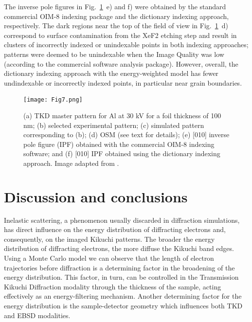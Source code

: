 The \hkl[010] inverse pole figures in Fig.~\ref{fig:TKDindex}~e) and f) were obtained by the standard commercial OIM-8 indexing package and the dictionary indexing approach, respectively. The dark regions near the top of the field of view in Fig.~\ref{fig:TKDindex}~d) correspond to surface contamination from the XeF2 etching step and result in clusters of incorrectly indexed or unindexable points in both indexing approaches; patterns were deemed to be unindexable when the Image Quality was low (according to the commercial software analysis package). However, overall, the dictionary indexing approach with the energy-weighted model has fewer undindexable or incorrectly indexed points, in particular near grain boundaries.

\begin{figure}[t]
\centering
\texttt{[image: Fig7.png]}
\caption[Dictionary indexing TKD pattern]{ (a) TKD master pattern for Al at 30 kV for a foil thickness of 100 nm; (b) selected experimental pattern; (c) simulated pattern corresponding to (b); (d) OSM (see text for details); (e) [010] inverse pole figure (IPF) obtained with the commercial OIM-8 indexing software; and (f) [010] IPF obtained using the dictionary indexing approach. Image adapted from \cite{PascalTKD}. }
\label{fig:TKDindex}
\end{figure}


%
\section{Discussion and conclusions \label{sec:discussion}}

Inelastic scattering, a phenomenon usually discarded in diffraction simulations, has direct influence on the energy distribution of diffracting electrons and, consequently, on the imaged Kikuchi patterns. The broader the energy distribution of diffracting electrons, the more diffuse the Kikuchi band edges. Using a Monte Carlo model we can observe that the length of electron trajectories before diffraction is a determining factor in the broadening of the energy distribution. This factor, in turn, can be controlled in the Transmission Kikuchi Diffraction modality through the thickness of the sample, acting effectively as an energy-filtering mechanism. Another determining factor for the energy distribution is the sample-detector geometry which influences both TKD and EBSD modalities.



